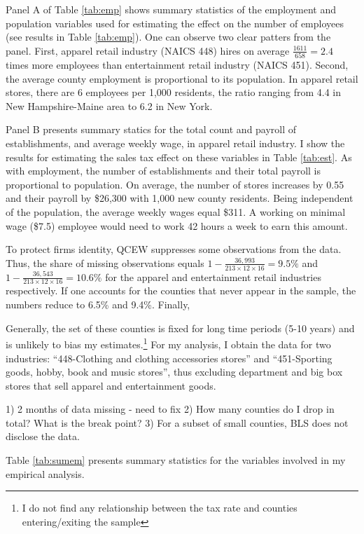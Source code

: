 \documentclass[12pt]{article}
\begin{document}
		Panel A of Table \ref{tab:emp} shows summary statistics of the employment and population variables used for estimating the effect on the number of employees (see results in Table \ref{tab:emp}). One can observe two clear patters from the panel. First, apparel retail industry (NAICS 448) hires on average $\frac{1611}{658}=2.4$ times more employees than entertainment retail industry (NAICS 451). Second, the average county employment is proportional to its population. In apparel retail stores, there are 6 employees per 1,000 residents, the ratio ranging from 4.4 in New Hampshire-Maine area to 6.2 in New York.
		
		Panel B presents summary statics for the total count and payroll of establishments, and average weekly wage, in apparel retail industry. I show the results for estimating the sales tax effect on these variables in Table \ref{tab:est}. As with employment, the number of establishments and their total payroll is proportional to population. On average, the number of stores increases by 0.55 and their payroll by \$26,300 with 1,000 new county residents. Being independent of the population, the average weekly wages equal \$311. A working on minimal wage (\$7.5) employee would need to work 42 hours a week to earn this amount.
		
		
		To protect firms identity, QCEW suppresses some observations from the data. Thus, the share of missing observations equals $1-\frac{36,993}{213\times12\times16}=9.5\%$ and $1-\frac{36,543}{213\times12\times16}=10.6\%$ for the apparel and entertainment retail industries respectively. If one accounts for the counties that never appear in the sample, the numbers reduce to 6.5\% and 9.4\%. Finally, 
		
		Generally, the set of these counties is fixed for long time periods (5-10 years) and is unlikely to bias my estimates.\footnote{I do not find any relationship between the tax rate and counties entering/exiting the sample} For my analysis, I obtain the data for two industries: ``448-Clothing and clothing accessories stores'' and ``451-Sporting goods, hobby, book and music stores'', thus excluding department and big box stores that sell apparel and entertainment goods.
		
 
		
		1) 2 months of data missing - need to fix
		2) How many counties do I drop in total? What is the break point?
		3) For a subset of small counties, BLS does not disclose the data. 
		
		Table \ref{tab:sumem} presents summary statistics for the variables involved in my empirical analysis.
		
\end{document}
